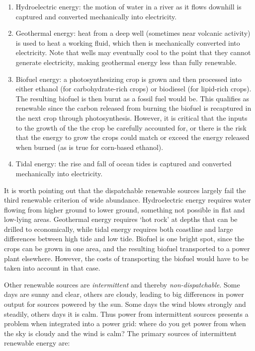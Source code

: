 \begin{enumerate}

\item Hydroelectric energy: the motion of water in a river as it flows downhill is captured and converted mechanically into electricity.

\item Geothermal energy: heat from a deep well (sometimes near volcanic activity) is used to heat a working fluid, which then is mechanically converted into electricity. Note that wells may eventually cool to the point that they cannot generate electricity, making geothermal energy less than fully renewable.

\item Biofuel energy: a photosynthesizing crop is grown and then processed into either ethanol (for carbohydrate-rich crops) or biodiesel (for lipid-rich crops). The resulting biofuel is then burnt as a fossil fuel would be. This qualifies as renewable since the carbon released from burning the biofuel is recaptured in the next crop through photosynthesis. However, it is critical that the inputs to the growth of the the crop be carefully accounted for, or there is the risk that the energy to grow the crops could match or exceed the energy released when burned (as is true for corn-based ethanol).

\item Tidal energy: the rise and fall of ocean tides is captured and converted mechanically into electricity.

\end{enumerate}

It is worth pointing out that the dispatchable renewable sources largely fail the third renewable criterion of wide abundance. Hydroelectric energy requires water flowing from higher ground to lower ground, something not possible in flat and low-lying areas. Geothermal energy requires `hot rock' at depths that can be drilled to economically, while tidal energy requires both coastline and large differences between high tide and low tide. Biofuel is one bright spot, since the crops can be grown in one area, and the resulting biofuel transported to a power plant elsewhere. However, the costs of transporting the biofuel would have to be taken into account in that case.

Other renewable sources are \emph{intermittent} and thereby \emph{non-dispatchable}. Some days are sunny and clear, others are cloudy, leading to big differences in power output for sources powered by the sun. Some days the wind blows strongly and steadily, others days it is calm. Thus power from intermittent sources presents a problem when integrated into a power grid: where do you get power from when the sky is cloudy and the wind is calm? The primary sources of intermittent renewable energy are:

